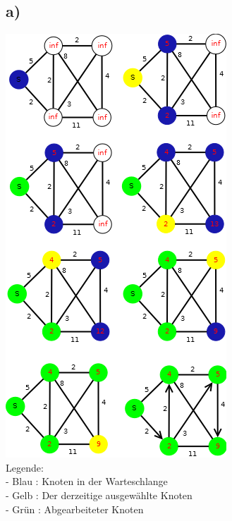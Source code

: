 \documentclass[a4paper,11pt,twoside]{article}
\begin{document}
\subsection*{a)}
\includegraphics*[scale=0.8]{Bilder/2a_Dijkstra.png}\\
Legende:\\
- Blau : Knoten in der Warteschlange\\
- Gelb : Der derzeitige ausgewählte Knoten\\
- Grün : Abgearbeiteter Knoten\\
\end{document}
